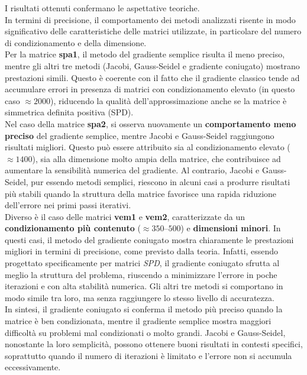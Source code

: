 I risultati ottenuti confermano le aspettative teoriche. \\

In termini di precisione, il comportamento dei metodi analizzati risente in modo significativo delle caratteristiche delle matrici utilizzate, in particolare del numero di condizionamento e della dimensione. \\

Per la matrice \textbf{spa1}, il metodo del gradiente semplice risulta il meno preciso, mentre gli altri tre metodi (Jacobi, Gauss-Seidel e gradiente coniugato) mostrano prestazioni simili. Questo è coerente con il fatto che il gradiente classico tende ad accumulare errori in presenza di matrici con condizionamento elevato (in questo caso $\approx 2000$), riducendo la qualità dell'approssimazione anche se la matrice è simmetrica definita positiva (SPD).\\

Nel caso della matrice \textbf{spa2}, si osserva nuovamente un \textbf{comportamento meno preciso} del gradiente semplice, mentre Jacobi e Gauss-Seidel raggiungono risultati migliori. Questo può essere attribuito sia al condizionamento elevato ($\approx 1400$), sia alla dimensione molto ampia della matrice, che contribuisce ad aumentare la sensibilità numerica del gradiente. Al contrario, Jacobi e Gauss-Seidel, pur essendo metodi semplici, riescono in alcuni casi a produrre risultati più stabili quando la struttura della matrice favorisce una rapida riduzione dell’errore nei primi passi iterativi. \\

Diverso è il caso delle matrici \textbf{vem1} e \textbf{vem2}, caratterizzate da un \textbf{condizionamento più contenuto} ($\approx 350$--$500$) e \textbf{dimensioni minori}. In questi casi, il metodo del gradiente coniugato mostra chiaramente le prestazioni migliori in termini di precisione, come previsto dalla teoria. Infatti, essendo progettato specificamente per matrici \textit{SPD}, il gradiente coniugato sfrutta al meglio la struttura del problema, riuscendo a minimizzare l’errore in poche iterazioni e con alta stabilità numerica. Gli altri tre metodi si comportano in modo simile tra loro, ma senza raggiungere lo stesso livello di accuratezza.\\

In sintesi, il gradiente coniugato si conferma il metodo più preciso quando la matrice è ben condizionata, mentre il gradiente semplice mostra maggiori difficoltà su problemi mal condizionati o molto grandi. Jacobi e Gauss-Seidel, nonostante la loro semplicità, possono ottenere buoni risultati in contesti specifici, soprattutto quando il numero di iterazioni è limitato e l’errore non si accumula eccessivamente. \\
